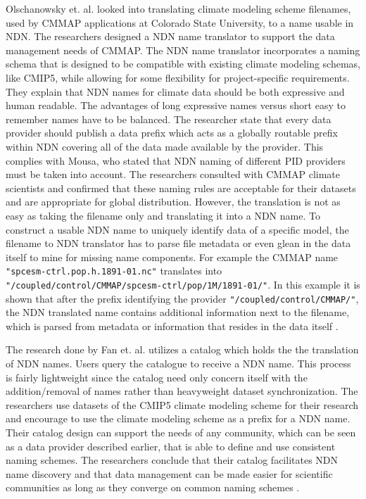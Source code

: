Olschanowsky et. al. looked into translating climate modeling scheme filenames, used by CMMAP applications at Colorado State University, to a name usable in NDN. The researchers designed a NDN name translator to support the data management needs of CMMAP. The NDN name translator incorporates a naming schema that is designed to be compatible with existing climate modeling schemas, like CMIP5, while allowing for some flexibility for project-specific requirements. 
They explain that NDN names for climate data should be both expressive and human readable. The advantages of long expressive names versus short easy to remember names have to be balanced.
The researcher state that every data provider should publish a data prefix which acts as a globally
routable prefix within NDN covering all of the data made available by the
provider. This complies with Mousa, who stated that NDN naming of different PID providers must be taken into account.
The researchers consulted with CMMAP climate scientists and confirmed that these naming rules are acceptable for their datasets and are appropriate for global distribution. 
However, the translation is not as easy as taking the filename only and translating it into a NDN name. To construct a usable NDN name to uniquely identify data of a specific model, the filename to NDN translator has to parse file metadata or even glean in the data itself to mine for missing name components. 
For example the CMMAP name \texttt{"spcesm-ctrl.pop.h.1891-01.nc"} translates into \texttt{"/coupled/control/CMMAP/spcesm-ctrl/pop/1M/1891-01/"}. In this example it is shown that after the prefix identifying the provider \texttt{"/coupled/control/CMMAP/"}, the NDN translated name contains additional information next to the filename, which is parsed from metadata or information that resides in the data itself \cite{ndn-clim}.

The research done by Fan et. al. utilizes a catalog which holds the the translation of NDN names. Users query the catalogue to receive a NDN name. This process is fairly lightweight since the catalog need only concern itself
with the addition/removal of names rather than heavyweight
dataset synchronization.
The researchers use datasets of the CMIP5 climate modeling scheme for their research and encourage to use the climate modeling scheme as a prefix for a NDN name. 
Their catalog design can support the needs of any community, which can be seen as a data provider described earlier, that is able to define and use consistent naming schemes.
The researchers conclude that their catalog facilitates NDN name discovery and that data management can be made easier for scientific communities as long as they converge on common naming schemes \cite{ndn-man}. 

